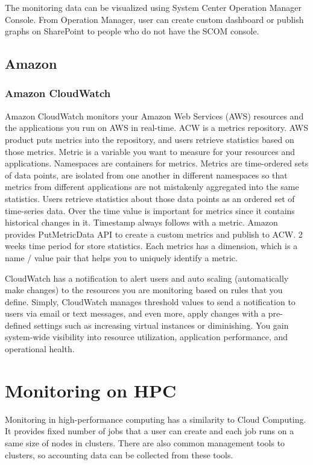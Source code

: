 \documentclass{sig-alternate}
\begin{document}
The monitoring data can be visualized using System Center Operation Manager Console. From Operation Manager, user can create custom dashboard or publish graphs on SharePoint to people who do not have the SCOM console.

\subsection{Amazon}

\subsubsection{Amazon CloudWatch}

Amazon CloudWatch monitors your Amazon Web Services (AWS) resources and the applications you run on AWS in real-time. ACW is a metrics repository. AWS product puts metrics into the repository, and users retrieve statistics based on those metrics. Metric is a variable you want to measure for your resources and applications. Namespaces are containers for metrics. Metrics are time-ordered sets of data points, are isolated from one another in different namespaces so that metrics from different applications are not mistakenly aggregated into the same statistics. Users retrieve statistics about those data points as an ordered set of time-series data. Over the time value is important for metrics since it contains historical changes in it. Timestamp always follows with a metric. Amazon provides PutMetricData API to create a custom metrics and publish to ACW. 2 weeks time period for store statistics. Each metrics has a dimension, which is a name / value pair that helps you to uniquely identify a metric.

CloudWatch has a notification to alert users and auto scaling (automatically make changes) to the resources you are monitoring based on rules that you define. Simply, CloudWatch manages threshold values to send a notification to users via email or text messages, and even more, apply changes with a pre-defined settings such as increasing virtual instances or diminishing. You gain system-wide visibility into resource utilization, application performance, and operational health.

\section{Monitoring on HPC}

Monitoring in high-performance computing has a similarity to Cloud Computing. It provides fixed number of jobs that a user can create and each job runs on a same size of nodes in clusters. There are also common management tools to clusters, so accounting data can be collected from these tools.
\end{document}

